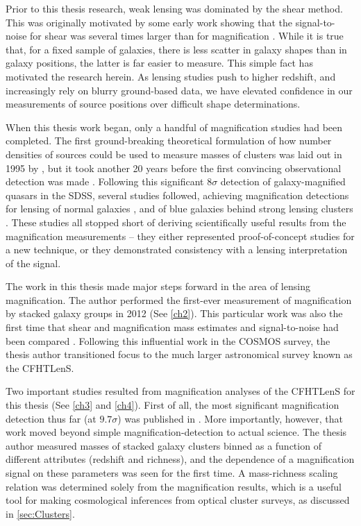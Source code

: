 Prior to this thesis research, weak lensing was dominated by the shear method. This was originally motivated by some early work showing that the signal-to-noise for shear was several times larger than for magnification \citep{Schneider00}. While it is true that, for a fixed sample of galaxies, there is less scatter in galaxy shapes than in galaxy positions, the latter is far easier to measure. This simple fact has motivated the research herein. As lensing studies push to higher redshift, and increasingly rely on blurry ground-based data, we have elevated confidence in our measurements of source positions over difficult shape determinations. 

When this thesis work began, only a handful of magnification studies had been completed. The first ground-breaking theoretical formulation of how number densities of sources could be used to measure masses of clusters was laid out in 1995 by \citet{Broadhurst95}, but it took another 20 years before the first convincing observational detection was made \citep{Scranton05}. Following this significant $8\sigma$ detection of galaxy-magnified quasars in the \ac{SDSS}, several studies followed, achieving magnification detections for lensing of normal galaxies \citep{Hildebrandt09b}, and of blue galaxies behind strong lensing clusters \citep{Umetsu11}. These studies all stopped short of deriving scientifically useful results from the magnification measurements -- they either represented proof-of-concept studies for a new technique, or they demonstrated consistency with a lensing interpretation of the signal.

The work in this thesis made major steps forward in the area of lensing magnification. The author performed the first-ever measurement of magnification by stacked galaxy groups in 2012 (See \autoref{ch2}). This particular work was also the first time that shear and magnification mass estimates and signal-to-noise had been compared \citep{Ford12}. Following this influential work in the \acf{COSMOS} survey, the thesis author transitioned focus to the much larger astronomical survey known as the \acf{CFHTLenS}. 

Two important studies resulted from magnification analyses of the \ac{CFHTLenS} for this thesis (See \autoref{ch3} and \autoref{ch4}). First of all, the most significant magnification detection thus far (at $9.7\sigma$) was published in \citet{Ford14}. More importantly, however, that work moved beyond simple magnification-detection to actual science. The thesis author measured masses of stacked galaxy clusters binned as a function of different attributes (redshift and richness), and the dependence of a magnification signal on these parameters was seen for the first time. A mass-richness scaling relation was determined solely from the magnification results, which is a useful tool for making cosmological inferences from optical cluster surveys, as discussed in \autoref{sec:Clusters}. 


